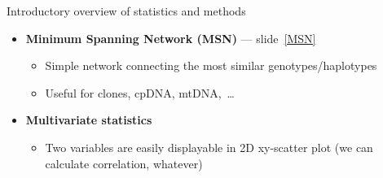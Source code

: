 \documentclass[compress, ucs, xelatex, 11pt, xcolor=svgnames,
  hyperref={
    bookmarks=true,
    unicode=true,
    colorlinks=true,
    pdftitle={Molecular data in R},
    plainpages=false,
    pdfauthor={Vojtech Zeisek},
    pdfsubject={Course about phylogeny and evolution in R},
    pdfcreator={XeLaTeX},
    pdfkeywords={R, evolution, phylogeny, molecular data},
    linkcolor=Tomato,
    anchorcolor=SaddleBrown,
    citecolor=Goldenrod,
    filecolor=DarkMagenta,
    menucolor=Sienna,
    urlcolor=DarkTurquoise,
    pdftex},
  url={hyphens, lowtilde} %
  ]{beamer}
\begin{document}
\begin{frame}[allowframebreaks]{Introductory overview of statistics and methods}
\begin{itemize}
\begin{itemize}
\begin{itemize}
      \end{itemize}
      \item \textbf{Hierarchical clustering} --- from slide~\ref{hierclust}
      \begin{itemize}
	\item Several methods clustering individuals according to their (dis)similarity from top or down into clusters
	\item (Un)weighted per-group mean average (\textbf{U/WPGMA}) and others
	\item Used more in ecology, for genetic data not so much anymore (following methods use to produce better results)
      \end{itemize}
      \item \textbf{Neighbor-Joining (NJ)} --- from slide~\ref{NJ}
      \begin{itemize}
	\item A~tree starting from the two most similar individuals and connecting in the next steps next and next the most similar individual
	\item In some cases artificially chains individuals
	\item Several methods try to improve it --- slide~\ref{NJ-replacement}
      \end{itemize}
      \item \textbf{Principal Coordinates Analysis (PCoA)} --- from slide~\ref{pcoa}
      \begin{itemize}
	\item The most common method of multivariate statistics for genetic data
	\item Shows individuals in 2D scatter plot to retain maximum variability (by finding correlations among loci)
      \end{itemize}
    \end{itemize}
    \item \textbf{Minimum Spanning Network (MSN)} --- slide~\ref{MSN}
    \begin{itemize}
      \item Simple network connecting the most similar genotypes/haplotypes
      \item Useful for clones, cpDNA, mtDNA,~\ldots
      \end{itemize}
    \item \textbf{Multivariate statistics}
    \begin{itemize}
      \item Two variables are easily displayable in 2D xy-scatter plot (we can calculate correlation, whatever)

\end{itemize}
\end{itemize}
\end{frame}
\end{document}
